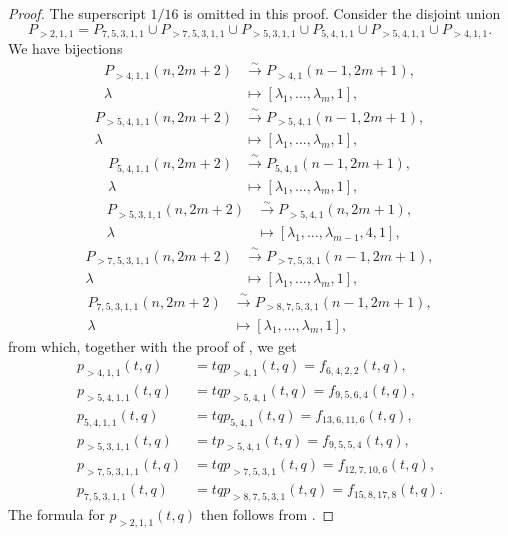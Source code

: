\documentclass[a4paper, 12pt, reqno]{amsart}
\theoremstyle{remark}
\numberwithin{equation}{subsection}
\begin{document}
\begin{proof}
  The superscript $1/16$ is omitted in this proof.
  Consider the disjoint union
  \begin{equation*}
    P_{>2, 1, 1} = P_{7, 5, 3, 1, 1} \cup P_{>7, 5, 3, 1, 1} \cup P_{>5, 3, 1, 1} \cup P_{5, 4, 1, 1} \cup P_{>5, 4, 1, 1} \cup P_{>4, 1, 1}.
  \end{equation*}
  We have bijections
  \begin{align*}
    P_{>4, 1, 1}(n, 2m + 2) &\xrightarrow{\sim} P_{>4, 1}(n - 1, 2m + 1), \\
    \lambda &\mapsto [\lambda_1, \dots, \lambda_m, 1],
  \end{align*}
  \begin{align*}
    P_{>5, 4, 1, 1}(n, 2m + 2) &\xrightarrow{\sim} P_{>5, 4, 1}(n - 1, 2m + 1), \\
    \lambda &\mapsto [\lambda_1, \dots, \lambda_m, 1],
  \end{align*}
  \begin{align*}
    P_{5, 4, 1, 1}(n, 2m + 2) &\xrightarrow{\sim} P_{5, 4, 1}(n - 1, 2m + 1), \\
    \lambda &\mapsto [\lambda_1, \dots, \lambda_m, 1],
  \end{align*}
  \begin{align*}
    P_{>5, 3, 1, 1}(n, 2m + 2) &\xrightarrow{\sim} P_{>5, 4, 1}(n, 2m + 1), \\
    \lambda &\mapsto [\lambda_1, \dots, \lambda_{m - 1}, 4, 1],
  \end{align*}
  \begin{align*}
    P_{>7, 5, 3, 1, 1}(n, 2m + 2) &\xrightarrow{\sim} P_{>7, 5, 3, 1}(n - 1, 2m + 1), \\
    \lambda &\mapsto [\lambda_1, \dots, \lambda_m, 1],
  \end{align*}
  \begin{align*}
    P_{7, 5, 3, 1, 1}(n, 2m + 2) &\xrightarrow{\sim} P_{>8, 7, 5, 3, 1}(n - 1, 2m + 1), \\
    \lambda &\mapsto [\lambda_1, \dots, \lambda_m, 1],
  \end{align*}
  from which, together with the proof of , we get
  \begin{align*}
    p_{>4, 1, 1}(t, q) &= tqp_{>4, 1}(t, q) = f_{6, 4, 2, 2}(t, q), \\
    p_{>5, 4, 1, 1}(t, q) &= tqp_{>5, 4, 1}(t, q) = f_{9, 5, 6, 4}(t, q), \\
    p_{5, 4, 1, 1}(t, q) &= tqp_{5, 4, 1}(t, q) = f_{13, 6, 11, 6}(t, q), \\
    p_{>5, 3, 1, 1}(t, q) &= tp_{>5, 4, 1}(t, q) = f_{9, 5, 5, 4}(t, q), \\
    p_{>7, 5, 3, 1, 1}(t, q) &= tqp_{>7, 5, 3, 1}(t, q) = f_{12, 7, 10, 6}(t, q), \\
    p_{7, 5, 3, 1, 1}(t, q) &= tqp_{>8, 7, 5, 3, 1}(t, q) = f_{15, 8, 17, 8}(t, q).
  \end{align*}
  The formula for $p_{>2, 1, 1}(t, q)$ then follows from .
\end{proof}
\end{document}

